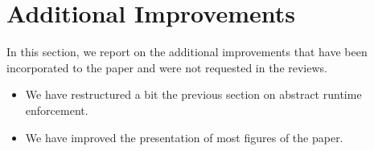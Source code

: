 \section{Additional Improvements}
\label{sec:improvements}
%
%
In this section, we report on the additional improvements that have been incorporated to the paper and were not requested in the reviews.
%
\begin{itemize}
\item
We have restructured a bit the previous section on abstract runtime enforcement.
\item
We have improved the presentation of most figures of the paper.
\end{itemize}